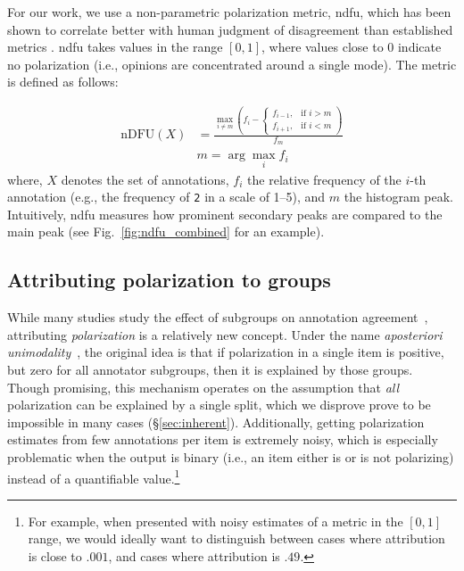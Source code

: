 \documentclass[11pt]{article}
\theoremstyle{definition}
\theoremstyle{plain}
\begin{document}
For our work, we use a non-parametric polarization metric, \ac{ndfu}, which has been shown to correlate better with human judgment of disagreement than established metrics \citep{pavlopoulos-likas-2024}. \ac{ndfu} takes values in the range $[0,1]$, where values close to $0$ indicate no polarization (i.e., opinions are concentrated around a single mode). The metric is defined as follows:

\begin{equation}
	\label{eq:ndfu}
	\begin{aligned}
		\mathrm{nDFU}(X)
		&=
		\frac{
			\displaystyle
			\max_{i \neq m}
			\left(
			f_i -
			\begin{cases}
				f_{i-1}, & \text{if } i > m \\
				f_{i+1}, & \text{if } i < m
			\end{cases}
			\right)
		}{
			f_m
		} \\
		& m = \arg\max_i f_i
	\end{aligned}
\end{equation}
\noindent where, $X$ denotes the set of annotations, $f_i$ the relative frequency of the $i$-th annotation (e.g., the frequency of \texttt{2} in a scale of 1--5), and $m$ the histogram peak. Intuitively, \ac{ndfu} measures how prominent secondary peaks are compared to the main peak (see Fig.~\ref{fig:ndfu_combined} for an example).


\subsection{Attributing polarization to groups}
\label{sec:related:attribution}

While many studies study the effect of subgroups on annotation agreement~\cite{goyal2022your, binns2017like, giorgi2025human, al2020identifying, sachdeva2022assessing}, attributing \emph{polarization} is a relatively new concept. Under the name \emph{aposteriori unimodality}~\cite{pavlopoulos-likas-2024}, the original idea is that if polarization in a single item is positive, but zero for all annotator subgroups, then it is explained by those groups. Though promising, this mechanism operates on the assumption that \emph{all} polarization can be explained by a single split, which we disprove prove to be impossible in many cases (\S\ref{sec:inherent}). Additionally, getting polarization estimates from few annotations per item is extremely noisy, which is especially problematic when the output is binary (i.e., an item either is or is not polarizing) instead of a quantifiable value.\footnote{For example, when presented with noisy estimates of a metric in the  $[0,1]$ range, we would ideally want to distinguish between cases where attribution is close to $.001$, and cases where attribution is $.49$.} 
\end{document}
